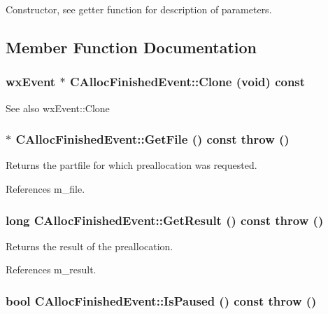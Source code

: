Constructor, see getter function for description of parameters. 

\subsection{Member Function Documentation}
\subsubsection[{Clone}]{\setlength{\rightskip}{0pt plus 5cm}wxEvent $\ast$ CAllocFinishedEvent::Clone (void) const\hspace{0.3cm}{\ttfamily  [virtual]}}\label{classCAllocFinishedEvent_a01f67fab259d692365507fe7f1260600}
\begin{DoxySeeAlso}{See also}
wxEvent::Clone 
\end{DoxySeeAlso}
\subsubsection[{GetFile}]{$\ast$ CAllocFinishedEvent::GetFile () const  throw ()\hspace{0.3cm}{\ttfamily  [inline]}}\label{classCAllocFinishedEvent_a4ae07c7bb032999f9ff2ae5d16452700}


Returns the partfile for which preallocation was requested. 

References m\_\-file.
\subsubsection[{GetResult}]{\setlength{\rightskip}{0pt plus 5cm}long CAllocFinishedEvent::GetResult () const  throw ()\hspace{0.3cm}{\ttfamily  [inline]}}\label{classCAllocFinishedEvent_ae3eefa5553bf6b21b599515b7a982788}


Returns the result of the preallocation. 

References m\_\-result.
\subsubsection[{IsPaused}]{\setlength{\rightskip}{0pt plus 5cm}bool CAllocFinishedEvent::IsPaused () const  throw ()\hspace{0.3cm}{\ttfamily  [inline]}}\label{classCAllocFinishedEvent_a4dfc5d565a81ccac35830ab85c8895c2}


